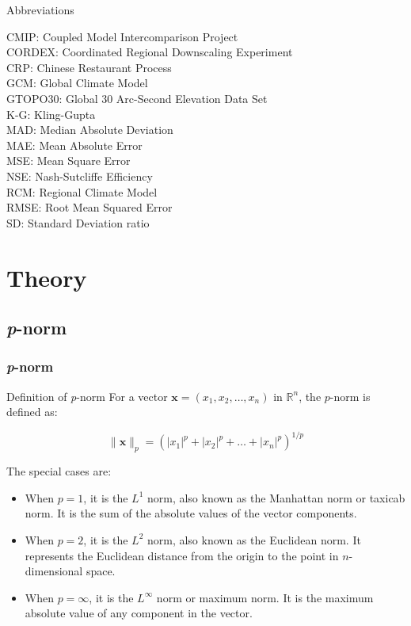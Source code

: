 \documentclass[xcolor={dvipsnames}]{beamer}
\begin{document}
\begin{frame}{Abbreviations}

CMIP: Coupled Model Intercomparison Project\\
CORDEX: Coordinated Regional Downscaling Experiment\\
CRP: Chinese Restaurant Process \\
GCM: Global Climate Model\\
GTOPO30: Global 30 Arc-Second Elevation Data Set\\
K-G: Kling-Gupta\\
MAD: Median Absolute Deviation\\
MAE: Mean Absolute Error\\
MSE: Mean Square Error\\
NSE: Nash-Sutcliffe Efficiency\\
RCM: Regional Climate Model\\
RMSE: Root Mean Squared Error\\
SD: Standard Deviation ratio 


\end{frame}

\section{Theory}

\subsection{\textit{p}-norm}

\begin{frame}
\frametitle{\textit{p}-norm}

\begin{alertblock}{Definition of \textit{p}-norm}
For a vector \( \mathbf{x} = (x_1, x_2, \ldots, x_n) \) in \( \mathbb{R}^n \), the \( p \)-norm is defined as:

\[ \| \mathbf{x} \|_p = \left( |x_1|^p + |x_2|^p + \ldots + |x_n|^p \right)^{1/p} \]
\end{alertblock}



The special cases are:

\begin{itemize}
\item<1-> When \( p = 1 \), it is the \( L^1 \) norm, also known as the Manhattan norm or taxicab norm. It is the sum of the absolute values of the vector components.

\item<2-> When \( p = 2 \), it is the \( L^2 \) norm, also known as the Euclidean norm. It represents the Euclidean distance from the origin to the point in \( n \)-dimensional space.

\item<3-> When \( p = \infty \), it is the \( L^\infty \) norm or maximum norm. It is the maximum absolute value of any component in the vector.
\end{itemize}

\end{frame}
\end{document}
